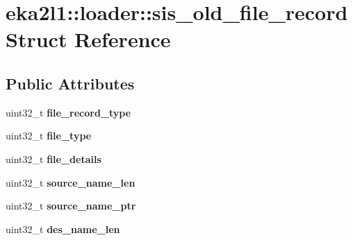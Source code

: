 \hypertarget{structeka2l1_1_1loader_1_1sis__old__file__record}{}\section{eka2l1\+:\+:loader\+:\+:sis\+\_\+old\+\_\+file\+\_\+record Struct Reference}
\label{structeka2l1_1_1loader_1_1sis__old__file__record}
\subsection*{Public Attributes}
\begin{DoxyCompactItemize}
\item 
\mbox{\label{structeka2l1_1_1loader_1_1sis__old__file__record_a17aeb821dfea4e22eabeb2f3707a1aec}} 
uint32\+\_\+t {\bfseries file\+\_\+record\+\_\+type}
\item 
\mbox{\label{structeka2l1_1_1loader_1_1sis__old__file__record_a1c8b256c307bf7b95da54dfdd9c07860}} 
uint32\+\_\+t {\bfseries file\+\_\+type}
\item 
\mbox{\label{structeka2l1_1_1loader_1_1sis__old__file__record_a75cc8fac46ecd0c6a5557773fcb87f63}} 
uint32\+\_\+t {\bfseries file\+\_\+details}
\item 
\mbox{\label{structeka2l1_1_1loader_1_1sis__old__file__record_a06924c70ff047378325faa84192d85bd}} 
uint32\+\_\+t {\bfseries source\+\_\+name\+\_\+len}
\item 
\mbox{\label{structeka2l1_1_1loader_1_1sis__old__file__record_a4c8f8ea8677cbf215e5f79e1fa6f40c0}} 
uint32\+\_\+t {\bfseries source\+\_\+name\+\_\+ptr}
\item 
\mbox{\label{structeka2l1_1_1loader_1_1sis__old__file__record_a349f5ec446e09ce54f8bc18c6441da19}} 
uint32\+\_\+t {\bfseries des\+\_\+name\+\_\+len}
\item 
\mbox{\label{structeka2l1_1_1loader_1_1sis__old__file__record_a0125964c965aaf7c7da356c940a1203e}} 

\end{DoxyCompactItemize}
